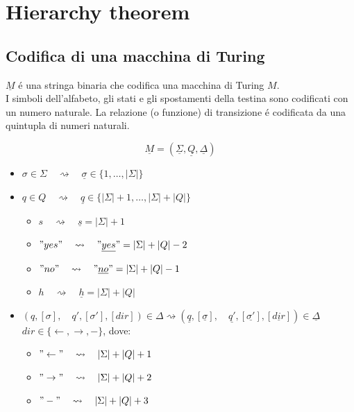 \section{Hierarchy theorem}

\subsection{Codifica di una macchina di Turing}
$\underline{M}$ é una stringa binaria che codifica una macchina di Turing $M$. \\
I simboli dell'alfabeto, gli stati e gli spostamenti della testina sono codificati con un numero naturale.
La relazione (o funzione) di transizione é codificata da una quintupla di numeri naturali.

\[\underline{M} = (\underline{\Sigma}, \underline{Q}, \underline{\Delta})\]

\begin{itemize}
    \item $\sigma \in \Sigma \quad \rightsquigarrow \quad \underline{\sigma} \in \{1, \dots, |\Sigma|\}$
    \item $q \in Q \quad \rightsquigarrow \quad \underline{q} \in \{|\Sigma| + 1, \dots, |\Sigma| + |Q|\}$
    \begin{itemize}
        \item $s     \quad \rightsquigarrow \quad \underline{s}     = |\Sigma| + 1$
        \item $"yes" \quad \rightsquigarrow \quad "\underline{yes}" = |\Sigma| + |Q| - 2$
        \item $"no"  \quad \rightsquigarrow \quad "\underline{no}"  = |\Sigma| + |Q| - 1$
        \item $h     \quad \rightsquigarrow \quad \underline{h}     = |\Sigma| + |Q|$
    \end{itemize}
    \item $(q, [\sigma], \quad q', [\sigma'], [dir]) \in \Delta \rightsquigarrow (\underline{q}, [\underline{\sigma}], \quad \underline{q'}, [\underline{\sigma'}], [\underline{dir}]) \in \underline{\Delta}$
    \subitem $dir \in \{ \leftarrow, \rightarrow, -\}$, dove:
    \begin{itemize}
        \item $"\leftarrow" \quad \rightsquigarrow \quad |\Sigma| + |Q| + 1$
        \item $"\rightarrow" \quad \rightsquigarrow \quad |\Sigma| + |Q| + 2$
        \item $"- " \quad \rightsquigarrow \quad |\Sigma| + |Q| + 3$
    \end{itemize}
\end{itemize}

